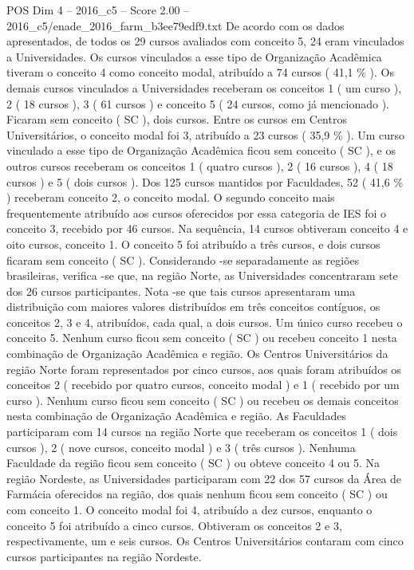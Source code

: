 \begin{textsample}{POS Dim 4 – 2016\_c5 – Score 2.00 – 2016\_c5/enade\_2016\_farm\_b3ee79edf9.txt}
De acordo com os dados apresentados, de todos os 29 cursos avaliados com conceito 5, 24 eram vinculados a Universidades.
Os cursos vinculados a esse tipo de Organização Acadêmica tiveram o conceito 4 como conceito modal, atribuído a 74 cursos ( 41,1 \% ).
Os demais cursos vinculados a Universidades receberam os conceitos 1 ( um curso ), 2 ( 18 cursos ), 3 ( 61 cursos ) e conceito 5 ( 24 cursos, como já mencionado ).
Ficaram sem conceito ( SC ), dois cursos.
Entre os cursos em Centros Universitários, o conceito modal foi 3, atribuído a 23 cursos ( 35,9 \% ).
Um curso vinculado a esse tipo de Organização Acadêmica ficou sem conceito ( SC ), e os outros cursos receberam os conceitos 1 ( quatro cursos ), 2 ( 16 cursos ), 4 ( 18 cursos ) e 5 ( dois cursos ).
Dos 125 cursos mantidos por Faculdades, 52 ( 41,6 \% ) receberam conceito 2, o conceito modal.
O segundo conceito mais frequentemente atribuído aos cursos oferecidos por essa categoria de IES foi o conceito 3, recebido por 46 cursos.
Na sequência, 14 cursos obtiveram conceito 4 e oito cursos, conceito 1.
O conceito 5 foi atribuído a três cursos, e dois cursos ficaram sem conceito ( SC ).
Considerando -se separadamente as regiões brasileiras, verifica -se que, na região Norte, as Universidades concentraram sete dos 26 cursos participantes.
Nota -se que tais cursos apresentaram uma distribuição com maiores valores distribuídos em três conceitos contíguos, os conceitos 2, 3 e 4, atribuídos, cada qual, a dois cursos.
Um único curso recebeu o conceito 5.
Nenhum curso ficou sem conceito ( SC ) ou recebeu conceito 1 nesta combinação de Organização Acadêmica e região.
Os Centros Universitários da região Norte foram representados por cinco cursos, aos quais foram atribuídos os conceitos 2 ( recebido por quatro cursos, conceito modal ) e 1 ( recebido por um curso ).
Nenhum curso ficou sem conceito ( SC ) ou recebeu os demais conceitos nesta combinação de Organização Acadêmica e região.
As Faculdades participaram com 14 cursos na região Norte que receberam os conceitos 1 ( dois cursos ), 2 ( nove cursos, conceito modal ) e 3 ( três cursos ).
Nenhuma Faculdade da região ficou sem conceito ( SC ) ou obteve conceito 4 ou 5.
Na região Nordeste, as Universidades participaram com 22 dos 57 cursos da Área de Farmácia oferecidos na região, dos quais nenhum ficou sem conceito ( SC ) ou com conceito 1.
O conceito modal foi 4, atribuído a dez cursos, enquanto o conceito 5 foi atribuído a cinco cursos.
Obtiveram os conceitos 2 e 3, respectivamente, um e seis cursos.
Os Centros Universitários contaram com cinco cursos participantes na região Nordeste.

\end{textsample}
